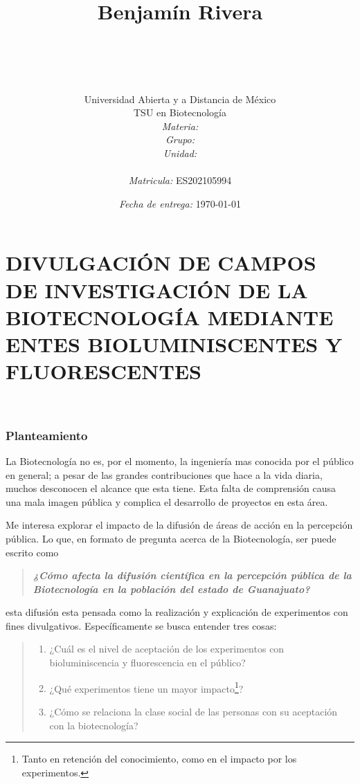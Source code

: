 \documentclass[12pt]{article}
\title{
	\ \\ Benjam\'in Rivera \\
	\bf{\titulo}\\\ \\}
\author{
	{\Huge Universidad Abierta y a Distancia de México} \\
	TSU en Biotecnolog\'ia \\
	\textit{Materia:} \materia \\
	\textit{Grupo:} \grupo \\
	\textit{Unidad:} \unidad \\
	\\
	\textit{Matricula:} ES202105994 }
\date{\textit{Fecha de entrega:} \today}
\newcommand{\tema}[0]{divulgación de campos de investigación de la biotecnología mediante entes bioluminiscentes y fluorescentes}
\begin{document}
\maketitle\newpage

\tableofcontents
\listoffigures
\newpage

\part*{\MakeUppercase{\tema}}
\ \\


\section{Planteamiento}
	
	\par La Biotecnología no es, por el momento, la ingeniería mas conocida por el público en general; a pesar de las grandes contribuciones que hace a la vida diaria, muchos desconocen el alcance que esta tiene. Esta falta de comprensión causa una mala imagen pública y complica el desarrollo de proyectos en esta área.
	\par Me interesa explorar el impacto de la difusión de áreas de acción en la percepción pública. Lo que, en formato de pregunta acerca de la Biotecnología, ser puede escrito como
	\begin{quote}
		\textbf{\textit{¿Cómo afecta la difusión científica en la percepción pública de la Biotecnología en la población del estado de Guanajuato?}}
	\end{quote}
	  
	\noindent esta difusión esta pensada como la realización y explicación de experimentos con fines divulgativos. Específicamente se busca entender tres cosas:
	
	\begin{quote}
	\begin{enumerate}\it
			\item ¿Cuál es el nivel de aceptación de los experimentos con bioluminiscencia y fluorescencia en el público?
			\item ¿Qué experimentos tiene un mayor impacto\footnote{Tanto en retención del conocimiento, como en el impacto por los experimentos.}?
			\item ¿Cómo se relaciona la clase social de las personas con su aceptación con la biotecnología?
	\end{enumerate}
	\end{quote}
\end{document}
